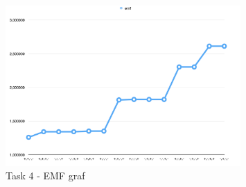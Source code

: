 \begin{figure}[h]
	\centering
    \includegraphics[width=0.8\textwidth]{sections/Exercise4/task4emf_graph.png}
	    \caption{Task 4 - EMF graf}
	    \label{fig:task4EMF_graph}
\end{figure}

